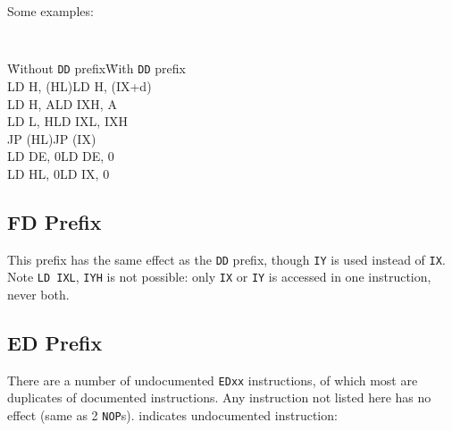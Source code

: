 \pagebreak
Some examples:

{\tt 
	\begin{tabbing}
		{\qquad}\={\rm Without {\tt DD} prefix}\qquad\={\rm With {\tt DD} prefix}\+ \\
		LD H, (HL)\>LD H, (IX+d)\\
		LD H, A\>LD IXH, A\\
		LD L, H\>LD IXL, IXH\\
		JP (HL)\>JP (IX)\\
		LD DE, 0\>LD DE, 0\\
		LD HL, 0\>LD IX, 0\\
	\end{tabbing}
}


\subsection{FD Prefix \cite{gerton}}

This prefix has the same effect as the {\tt DD} prefix, though {\tt IY} is used instead of {\tt IX}.  Note {\tt LD IXL}, {\tt IYH} is not possible: only {\tt IX} or {\tt IY} is accessed in one instruction, never both.


\subsection{ED Prefix \cite{gerton}}

There are a number of undocumented {\tt EDxx} instructions, of which most are duplicates of documented instructions. Any instruction not listed here has no effect (same as 2 {\tt NOP}s). \See{**} indicates undocumented instruction:

